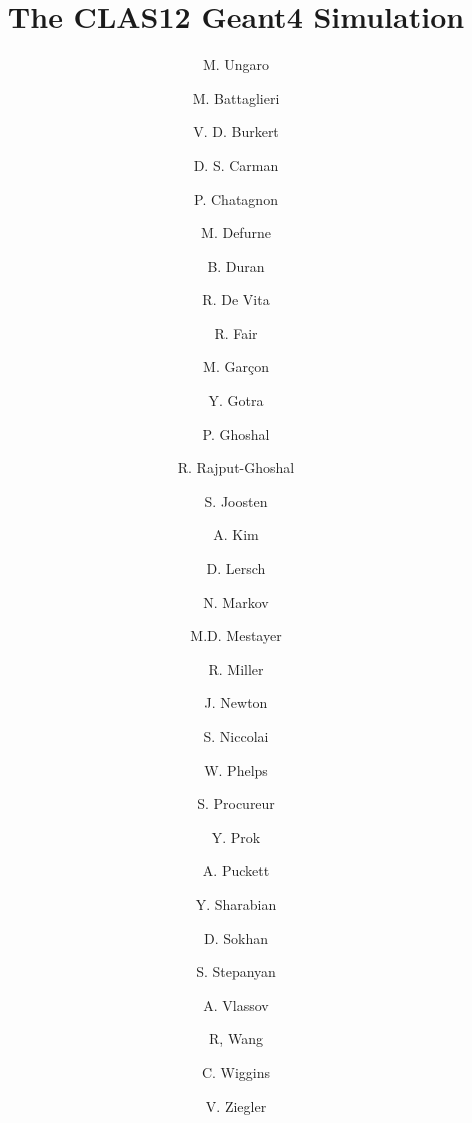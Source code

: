 \title{The CLAS12 Geant4 Simulation}



\author[A]{M. Ungaro}
\author[B]{M. Battaglieri}
\author[A]{V. D. Burkert}
\author[A]{D. S. Carman}
\author[E]{P. Chatagnon}
\author[C]{M. Defurne}
\author[K]{B. Duran}
\author[B]{R. De Vita}
\author[A]{R. Fair}
\author[C]{M. Gar\c con}
\author[A]{Y. Gotra}
\author[A]{P. Ghoshal}
\author[A]{R. Rajput-Ghoshal}
\author[K]{S. Joosten}
\author[D]{A. Kim}
\author[J]{D. Lersch}
\author[D]{N. Markov}
\author[A]{M.D. Mestayer}
\author[A]{R. Miller}
\author[H]{J. Newton}
\author[E]{S. Niccolai}
\author[L]{W. Phelps}
\author[C]{S. Procureur}
\author[H, I]{Y. Prok}
\author[D]{A. Puckett}
\author[A]{Y. Sharabian}
\author[F]{D. Sokhan}
\author[A]{S. Stepanyan}
\author[G]{A. Vlassov}
\author[E]{R, Wang}
\author[A]{C. Wiggins}
\author[A]{V. Ziegler}

\address[A]{Thomas Jefferson National Accelerator Facility, Newport News, VA, USA}
\address[B]{Istituto Nazionale Di Fisica Nucleare, Genova, Italy}
\address[C]{IRFU, CEA, Universit\'e Paris-Saclay, F-91191 Gif-sur-Yvette, France}
\address[D]{University of Connecticut, Storrs, Connecticut}
\address[E]{Institut de Physique Nuclaire, CNRS-IN2P3, Univ. Paris-Sud, Universit Paris-Saclay, 91406 Orsay Cedex, France}
\address[F]{University of Glasgow, Glasgow G12 8QQ, United Kingdom }
\address[G]{Institute For Theoretical and Experimental Physics, Moscow, Russia}
\address[H]{Old Dominion University, Norfolk, VA, USA}
\address[I]{Virginia Commonwealth University, Richmond, VA, USA}
\address[J]{Florida State University, Tallahassee, FL, USA}
\address[K]{Temple University, Philadelphia, PA, USA}
\address[L]{George Washington University, Washington, DC, USA}
